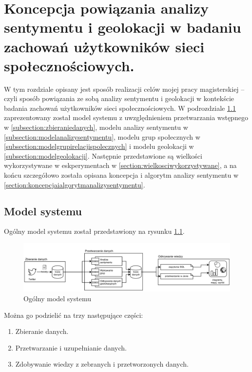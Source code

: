 \chapter{Koncepcja powiązania analizy sentymentu i geolokacji w badaniu
zachowań użytkowników sieci społecznościowych.}
\label{chapter:koncepcjarozwiazania}

W tym rozdziale opisany jest sposób realizacji celów mojej pracy magisterskiej
-- czyli sposób powiązania ze sobą analizy sentymentu i geolokacji w kontekście
badania zachowań użytkowników sieci społecznościowych. W podrozdziale
\ref{section:modelsystemu} zaprezentowany został model systemu z uwzględnieniem
przetwarzania wstępnego w \ref{subsection:zbieraniedanych}, modelu analizy
sentymentu w \ref{subsection:modelanalizysentymentu}, modelu grup społecznych w
\ref{subsection:modelgrupirelacjispolecznych} i modelu geolokacji w
\ref{subsection:modelgeolokacji}. Następnie przedstawione są wielkości
wykorzystywane w eskperymentach w \ref{section:wielkosciwykorzystywane}, a na
końcu szczegółowo została opisana koncepcja i algorytm analizy sentymentu w
\ref{section:koncepcjaialgorytmanalizysentymentu}.



\section{Model systemu}
\label{section:modelsystemu}
Ogólny model systemu został przedstawiony na rysunku \ref{image:model-systemu}.

\begin{figure}[ht!]
\centering
\includegraphics[width=160mm]{img/gruby-model.png}
\caption{Ogólny model systemu}
\label{image:model-systemu}
\end{figure}


Można go podzielić na trzy następujące części:
\begin{enumerate}
  \item Zbieranie danych.
  \item Przetwarzanie i uzupełnianie danych.
  \item Zdobywanie wiedzy z zebranych i przetworzonych danych.
\end{enumerate}



